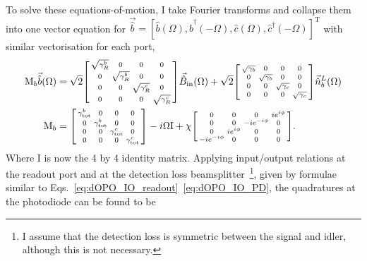 To solve these equations-of-motion, I take Fourier transforms and collapse them into one vector equation for $\vec{\hat b}=[\hat b(\Omega), \hat b^\dag(-\Omega), \hat c(\Omega), \hat c^\dag(-\Omega)]^\text{T}$ with similar vectorisation for each port,
\begin{align}
\text{M}_b\vec{\hat b}(\Omega)&=\sqrt{2}\begin{bsmallmatrix}
\sqrt{\gamma^b_R} & 0 & 0 & 0 \\
0 & \sqrt{\gamma^b_R} & 0 & 0 \\
0 & 0 & \sqrt{\gamma^c_R} & 0 \\
0 & 0 & 0 & \sqrt{\gamma^c_R}
\end{bsmallmatrix}\vec{\hat B}_\mathrm{in}(\Omega) + \sqrt{2}\begin{bsmallmatrix}
\sqrt{\gamma_b} & 0 & 0 & 0 \\
0 & \sqrt{\gamma_b} & 0 & 0 \\
0 & 0 & \sqrt{\gamma_c} & 0 \\
0 & 0 & 0 & \sqrt{\gamma_c}
\end{bsmallmatrix}\vec{\hat n}^L_b(\Omega)\\
\text{M}_b&=\begin{bsmallmatrix}
\gamma^b_\mathrm{tot} & 0 & 0 & 0 \\
0 & \gamma^b_\mathrm{tot} & 0 & 0 \\
0 & 0 & \gamma^c_\mathrm{tot} & 0 \\
0 & 0 & 0 & \gamma^c_\mathrm{tot} 
\end{bsmallmatrix}-i\Omega \text{I}+\chi \begin{bsmallmatrix}
0 & 0 & 0 & i e^{i\phi} \\
0 & 0 & -i e^{-i\phi} & 0 \\
0 & i e^{i\phi} & 0 & 0 \\
-i e^{-i\phi} & 0 & 0 & 0
\end{bsmallmatrix}.
\end{align}
Where $\text{I}$ is now the 4 by 4 identity matrix. Applying input/output relations at the readout port and at the detection loss beamsplitter~\footnote{I assume that the detection loss is symmetric between the signal and idler, although this is not necessary.}, given by formulae similar to Eqs.~\ref{eq:dOPO_IO_readout}~\ref{eq:dOPO_IO_PD}, the quadratures at the photodiode can be found to be

